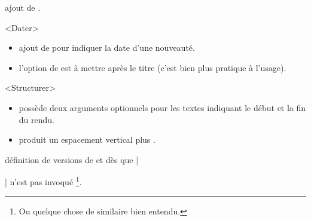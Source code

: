 

\begin{bdoctopic}
    ajout de .
\end{bdoctopic}




\begin{bdoctopic}<Dater>
    \begin{itemize}
        \item ajout de  pour indiquer la date d'une nouveauté.

        \item l'option de  est à mettre après le titre (c'est bien plus pratique à l'usage).
    \end{itemize}
\end{bdoctopic}




\begin{bdoctopic}<Structurer>
    \begin{itemize}
        \item {} possède deux arguments optionnels pour les textes indiquant le début et la fin du rendu.

        \item {} produit un espacement vertical plus .
    \end{itemize}
\end{bdoctopic}




\begin{bdoctopic}
    définition de versions  de  et  dès que \bdocinlatex|\usepackage[french]{babel}| n'est pas invoqué
    \footnote{
        Ou quelque chose de similaire bien entendu.
    }.
\end{bdoctopic}
